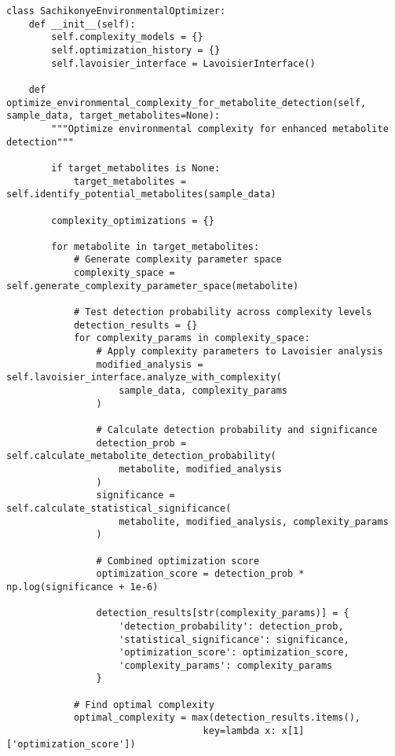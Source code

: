 \documentclass[12pt,a4paper]{article}
\begin{document}
\begin{lstlisting}[style=pythonstyle, caption=Environmental Complexity Optimization for Metabolomics]
class SachikonyeEnvironmentalOptimizer:
    def __init__(self):
        self.complexity_models = {}
        self.optimization_history = {}
        self.lavoisier_interface = LavoisierInterface()
    
    def optimize_environmental_complexity_for_metabolite_detection(self, sample_data, target_metabolites=None):
        """Optimize environmental complexity for enhanced metabolite detection"""
        
        if target_metabolites is None:
            target_metabolites = self.identify_potential_metabolites(sample_data)
        
        complexity_optimizations = {}
        
        for metabolite in target_metabolites:
            # Generate complexity parameter space
            complexity_space = self.generate_complexity_parameter_space(metabolite)
            
            # Test detection probability across complexity levels
            detection_results = {}
            for complexity_params in complexity_space:
                # Apply complexity parameters to Lavoisier analysis
                modified_analysis = self.lavoisier_interface.analyze_with_complexity(
                    sample_data, complexity_params
                )
                
                # Calculate detection probability and significance
                detection_prob = self.calculate_metabolite_detection_probability(
                    metabolite, modified_analysis
                )
                significance = self.calculate_statistical_significance(
                    metabolite, modified_analysis, complexity_params
                )
                
                # Combined optimization score
                optimization_score = detection_prob * np.log(significance + 1e-6)
                
                detection_results[str(complexity_params)] = {
                    'detection_probability': detection_prob,
                    'statistical_significance': significance,
                    'optimization_score': optimization_score,
                    'complexity_params': complexity_params
                }
            
            # Find optimal complexity
            optimal_complexity = max(detection_results.items(), 
                                   key=lambda x: x[1]['optimization_score'])
            

\end{lstlisting}
\end{document}
